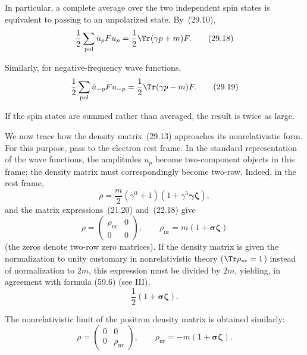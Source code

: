 In particular, a complete average over the two independent spin states is equivalent to passing to an unpolarized state. By~(29.10),
\begin{equation}
\frac{1}{2}\sum_{\text{pol}}\bar u_p Fu_p = \frac{1}{2}\Tr(\gamma p + m)F.
\tag{29.18}
\end{equation}

Similarly, for negative-frequency wave functions,
\begin{equation}
\frac{1}{2}\sum_{\text{pol}}\bar u_{-p}Fu_{-p} = \frac{1}{2}\Tr(\gamma p - m)F.
\tag{29.19}
\end{equation}

If the spin states are summed rather than averaged, the result is twice as large.

We now trace how the density matrix~(29.13) approaches its nonrelativistic form. For this purpose, pass to the electron rest frame. In the standard representation of the wave functions, the amplitudes $u_p$ become two-component objects in this frame; the density matrix must correspondingly become two-row. Indeed, in the rest frame,
\[
\rho = \frac{m}{2}(\gamma^0 + 1)(1 + \gamma^5\boldsymbol{\gamma}\boldsymbol{\zeta}),
\]
and the matrix expressions~(21.20) and~(22.18) give
\begin{equation}
\rho = \begin{pmatrix} \rho_{\text{nr}} & 0\\ 0 & 0 \end{pmatrix},\qquad \rho_{\text{nr}} = m(1 + \boldsymbol{\sigma}\boldsymbol{\zeta})
\tag{29.20}
\end{equation}
(the zeros denote two-row zero matrices). If the density matrix is given the normalization to unity customary in nonrelativistic theory ($\Tr\rho_{\text{nr}} = 1$) instead of normalization to $2m$, this expression must be divided by $2m$, yielding, in agreement with formula (59.6) (see III),
\[
\frac{1}{2}(1 + \boldsymbol{\sigma}\boldsymbol{\zeta}).
\]

The nonrelativistic limit of the positron density matrix is obtained similarly:
\[
\rho = \begin{pmatrix} 0 & 0\\ 0 & \rho_{\text{nr}} \end{pmatrix},\qquad \rho_{\text{nr}} = -m(1 + \boldsymbol{\sigma}\boldsymbol{\zeta}).
\]

